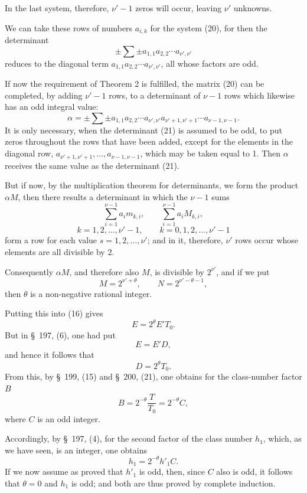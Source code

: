 \documentclass[11pt]{article}
\begin{document}
In the last system, therefore, $\nu'-1$ zeros will occur, leaving $\nu'$ unknowns.

We can take these rows of numbers $a_{i,k}$ for the system (20), for then the determinant
\begin{equation}
\pm\sum\pm a_{1,1}a_{2,2}\cdots a_{\nu',\nu'}
\tag{21}
\end{equation}
reduces to the diagonal term $a_{1,1}a_{2,2}\cdots a_{\nu',\nu'}$, all whose factors are odd.

If now the requirement of Theorem 2 is fulfilled, the matrix (20) can be completed, by adding $\nu'-1$ rows, to a determinant of $\nu-1$ rows which likewise has an odd integral value:
\begin{equation}
\alpha=\pm\sum\pm a_{1,1}a_{2,2}\cdots a_{\nu',\nu'}a_{\nu'+1,\nu'+1}\cdots a_{\nu-1,\nu-1}.
\tag{22}
\end{equation}
It is only necessary, when the determinant (21) is assumed to be odd, to put zeros throughout the rows that have been added, except for the elements in the diagonal row, $a_{\nu'+1,\nu'+1},\ldots,a_{\nu-1,\nu-1}$, which may be taken equal to 1. Then $\alpha$ receives the same value as the determinant (21).

But if now, by the multiplication theorem for determinants, we form the product $\alpha M$, then there results a determinant in which the $\nu-1$ sums
\[
\sum_{i=1}^{\nu-1}a_i m_{k,i},
\qquad
\sum_{i=1}^{\nu-1}a_i M_{k,i},
\]
\[
k=1,2,\ldots,\nu'-1,
\qquad
k=0,1,2,\ldots,\nu'-1
\]
form a row for each value $s=1,2,\ldots,\nu'$; and in it, therefore, $\nu'$ rows occur whose elements are all divisible by 2.

Consequently $\alpha M$, and therefore also $M$, is divisible by $2^{\nu'}$, and if we put
\begin{equation}
M=2^{\nu'+\theta},\qquad N=2^{\nu'-\theta-1},
\tag{23}
\end{equation}
then $\theta$ is a non-negative rational integer.

Putting this into (16) gives
\[
E=2^\theta E'T_0.
\]
But in \S~197, (6), one had put
\[
E=E'D,
\]
and hence it follows that
\[
D=2^\theta T_0.
\]
From this, by \S~199, (15) and \S~200, (21), one obtains for the class-number factor $B$
\begin{equation}
B=2^{-\theta}\frac{T}{T_0}=2^{-\theta}C,
\tag{24}
\end{equation}
where $C$ is an odd integer.

Accordingly, by \S~197, (4), for the second factor of the class number $h_1$, which, as we have seen, is an integer, one obtains
\begin{equation}
h_1=2^{-\theta}h'_1C.
\tag{25}
\end{equation}
If we now assume as proved that $h'_1$ is odd, then, since $C$ also is odd, it follows that $\theta=0$ and $h_1$ is odd; and both are thus proved by complete induction.
\end{document}
